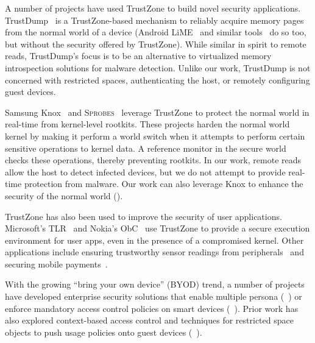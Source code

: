 \label{section:related}

%
A number of projects have used TrustZone to build novel security applications.
TrustDump~\cite{trustdump:esorics14} is a TrustZone-based mechanism to reliably
acquire memory pages from the normal world of a device (Android
LiME~\cite{lime} and similar tools~\cite{dmd,ddms,recoverymode} do so too, but
without the security offered by TrustZone).  While similar in spirit to remote
reads, TrustDump's focus is to be an alternative to virtualized memory
introspection solutions for malware detection. Unlike our work, TrustDump is
not concerned with restricted spaces, authenticating the host, or remotely
configuring guest devices.

Samsung Knox~\cite{knox:ccs14} and \textsc{Sprobes}~\cite{sprobes:most14}
leverage TrustZone to protect the normal world in real-time from kernel-level
rootkits. These projects harden the normal world kernel by making it perform a
world switch when it attempts to perform certain sensitive operations to kernel
data. A reference monitor in the secure world checks these operations, thereby
preventing rootkits. In our work, remote reads allow the host to detect
infected devices, but we do not attempt to provide real-time protection from
malware. Our work can also leverage Knox to enhance the security of the normal
world ().

TrustZone has also been used to improve the security of user applications.
Microsoft's TLR~\cite{tlr:asplos14} and Nokia's ObC~\cite{obc:asiaccs09} use
TrustZone to provide a secure execution environment for user apps, even in the
presence of a compromised kernel. Other applications include ensuring
trustworthy sensor readings from peripherals~\cite{tenor:mobisys12} and
securing mobile payments~\cite{proxama}.

 With the growing ``bring your own device''
(BYOD) trend, a number of projects have developed enterprise security solutions
that enable multiple persona
(\eg~\cite{asm:sec14,flaskdroid:sec13,cells:sosp11}) or enforce mandatory
access control policies on smart devices
(\eg~\cite{deepdroid:ndss15,seandroid:ndss13,flaskdroid:sec13,asm:sec14}).
Prior work has also explored context-based access control and techniques for
restricted space objects to push usage policies onto guest devices
(\eg~\cite{saint:acsac09,Covington2002,conxsense:asiaccs14,worlddriven:ccs14,blindspot:2009,markit:upside14}).

